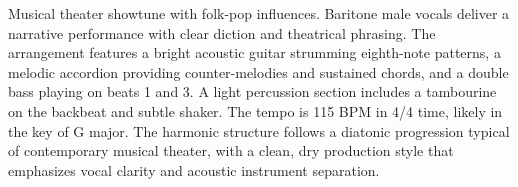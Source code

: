 

\begin{notes}
\end{notes}

\begin{style}
Musical theater showtune with folk-pop influences. %
Baritone male vocals deliver a narrative performance with clear diction and theatrical phrasing. %
The arrangement features a bright acoustic guitar strumming eighth-note patterns, a melodic accordion providing counter-melodies and sustained chords, and a double bass playing on beats 1 and 3. %
A light percussion section includes a tambourine on the backbeat and subtle shaker. %
The tempo is 115 BPM in 4/4 time, likely in the key of G major. %
The harmonic structure follows a diatonic progression typical of contemporary musical theater, with a clean, dry production style that emphasizes vocal clarity and acoustic instrument separation.
\end{style}

